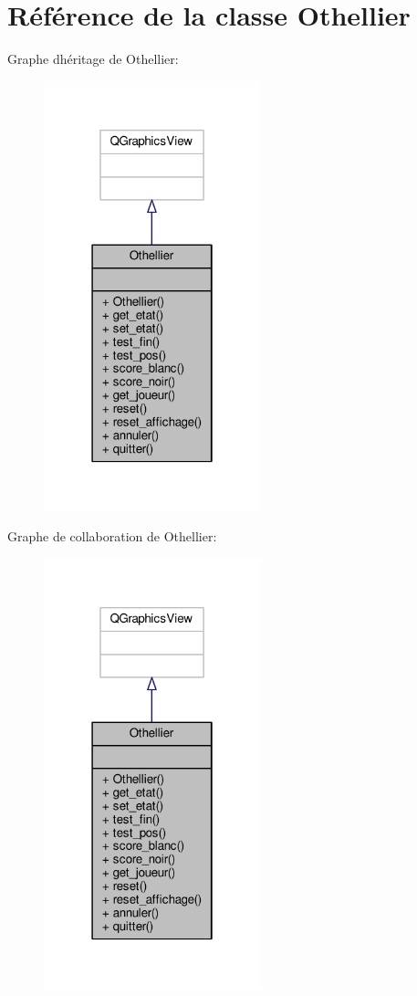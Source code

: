 \hypertarget{classOthellier}{}\section{Référence de la classe Othellier}
\label{classOthellier}


Graphe d\textquotesingle{}héritage de Othellier\+:
\nopagebreak
\begin{figure}[H]
\begin{center}
\leavevmode
\includegraphics[width=178pt]{classOthellier__inherit__graph}
\end{center}
\end{figure}


Graphe de collaboration de Othellier\+:
\nopagebreak
\begin{figure}[H]
\begin{center}
\leavevmode
\includegraphics[width=178pt]{classOthellier__coll__graph}
\end{center}
\end{figure}
